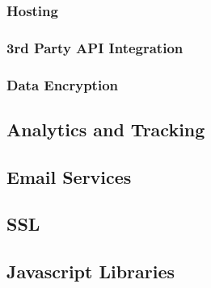 \documentclass[letterpaper,12pt,2p]{elsarticle}
\begin{document}
\subsubsection{ Hosting}
\label{subsec1}





\subsubsection{ 3rd Party API Integration}
\label{subsec1}





\subsubsection{ Data Encryption}
\label{subsec1}





\subsection{ Analytics and Tracking}
\label{subsec1}





\subsection{ Email Services}
\label{subsec1}





\subsection{ SSL}
\label{subsec1}





\subsection{ Javascript Libraries}
\label{subsec1}
\end{document}
